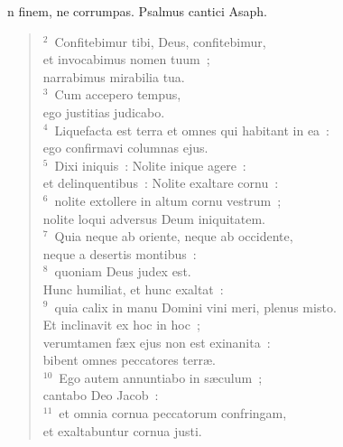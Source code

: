 \bchapter
{}n finem, ne corrumpas. Psalmus cantici Asaph.
\begin{flushleft}\begin{verse}\vspace{6pt}${}^{2}$~Confitebimur tibi, Deus, confitebimur,\\ et invocabimus nomen tuum~;\\ narrabimus mirabilia tua.\\
${}^{3}$~Cum accepero tempus,\\ ego justitias judicabo.\\
${}^{4}$~Liquefacta est terra et omnes qui habitant in ea~:\\ ego confirmavi columnas ejus.\\
${}^{5}$~Dixi iniquis~: Nolite inique agere~:\\ et delinquentibus~: Nolite exaltare cornu~:\\
${}^{6}$~nolite extollere in altum cornu vestrum~;\\ nolite loqui adversus Deum iniquitatem.\\
${}^{7}$~Quia neque ab oriente, neque ab occidente,\\ neque a desertis montibus~:\\
${}^{8}$~quoniam Deus judex est.\\ Hunc humiliat, et hunc exaltat~:\\
${}^{9}$~quia calix in manu Domini vini meri, plenus misto.\\ Et inclinavit ex hoc in hoc~;\\ verumtamen f\ae x ejus non est exinanita~:\\ bibent omnes peccatores terr\ae .\\
${}^{10}$~Ego autem annuntiabo in s\ae culum~;\\ cantabo Deo Jacob~:\\
${}^{11}$~et omnia cornua peccatorum confringam,\\ et exaltabuntur cornua justi.\end{verse}\end{flushleft}



